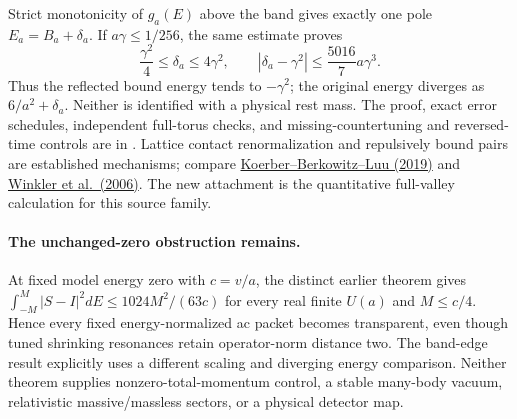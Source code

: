 Strict monotonicity of $g_a(E)$ above the band gives exactly one pole
$E_a=B_a+\delta_a$. If $a\gamma\leq1/256$, the same estimate proves
\[
 \frac{\gamma^2}{4}\leq\delta_a\leq4\gamma^2,
 \qquad |\delta_a-\gamma^2|\leq\frac{5016}{7}a\gamma^3.
\]
Thus the reflected bound energy tends to $-\gamma^2$; the original
energy diverges as $6/a^2+\delta_a$. Neither is identified with a physical
rest mass. The proof, exact error schedules, independent full-torus
checks, and missing-countertuning and reversed-time controls are in
. Lattice contact renormalization
and repulsively bound pairs are established mechanisms; compare
\href{https://arxiv.org/abs/1912.04425}{Koerber--Berkowitz--Luu (2019)}
and \href{https://arxiv.org/abs/cond-mat/0605196}{Winkler et al.\ (2006)}.
The new attachment is the quantitative full-valley calculation for this
source family.

\paragraph{The unchanged-zero obstruction remains.}
At fixed model energy zero with $c=v/a$, the distinct earlier theorem
gives $\int_{-M}^{M}|S-I|^2dE\leq1024M^2/(63c)$ for every real
finite $U(a)$ and $M\leq c/4$. Hence every fixed energy-normalized ac
packet becomes transparent, even though tuned shrinking resonances
retain operator-norm distance two. The band-edge result explicitly
uses a different scaling and diverging energy comparison. Neither
theorem supplies nonzero-total-momentum control, a stable many-body
vacuum, relativistic massive/massless sectors, or a physical detector map.
